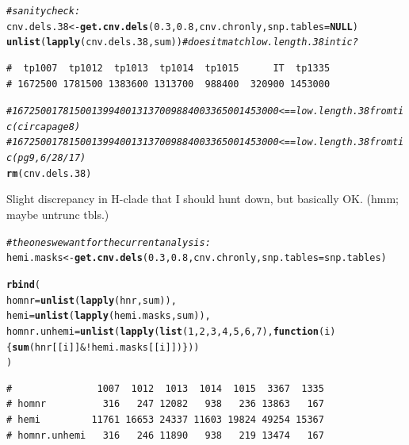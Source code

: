 \documentclass{article}\usepackage[]{graphicx}\usepackage[]{color}
\makeatletter
\newcommand{\hlnum}[1]{\textcolor[rgb]{0.686,0.059,0.569}{#1}}%
\newcommand{\hlcom}[1]{\textcolor[rgb]{0.678,0.584,0.686}{\textit{#1}}}%
\newcommand{\hlopt}[1]{\textcolor[rgb]{0,0,0}{#1}}%
\newcommand{\hlstd}[1]{\textcolor[rgb]{0.345,0.345,0.345}{#1}}%
\newcommand{\hlkwa}[1]{\textcolor[rgb]{0.161,0.373,0.58}{\textbf{#1}}}%
\newcommand{\hlkwb}[1]{\textcolor[rgb]{0.69,0.353,0.396}{#1}}%
\newcommand{\hlkwc}[1]{\textcolor[rgb]{0.333,0.667,0.333}{#1}}%
\newcommand{\hlkwd}[1]{\textcolor[rgb]{0.737,0.353,0.396}{\textbf{#1}}}%
\newenvironment{kframe}{%
 \def\at@end@of@kframe{}%
 \ifinner\ifhmode%
  \def\at@end@of@kframe{\end{minipage}}%
  \begin{minipage}{\columnwidth}%
 \fi\fi%
 \def\FrameCommand##1{\hskip\@totalleftmargin \hskip-\fboxsep
 \colorbox{shadecolor}{##1}\hskip-\fboxsep
     \hskip-\linewidth \hskip-\@totalleftmargin \hskip\columnwidth}%
 \MakeFramed {\advance\hsize-\width
   \@totalleftmargin\z@ \linewidth\hsize
   \@setminipage}}%
 {\par\unskip\endMakeFramed%
 \at@end@of@kframe}
\newenvironment{knitrout}{}{} %
\makeatother
\begin{document}
\begin{knitrout}
\begin{kframe}
\begin{alltt}
\hlcom{# sanity check:}
\hlstd{cnv.dels.38} \hlkwb{<-} \hlkwd{get.cnv.dels}\hlstd{(}\hlnum{0.3}\hlstd{,} \hlnum{0.8}\hlstd{, cnv.chronly,} \hlkwc{snp.tables} \hlstd{=} \hlkwa{NULL}\hlstd{)}
\hlkwd{unlist}\hlstd{(}\hlkwd{lapply}\hlstd{(cnv.dels.38,sum))} \hlcom{# does it match low.length.38 in tic ?}
\end{alltt}
\begin{verbatim}
#  tp1007  tp1012  tp1013  tp1014  tp1015      IT  tp1335 
# 1672500 1781500 1383600 1313700  988400  320900 1453000
\end{verbatim}
\begin{alltt}
\hlcom{# 1672500 1781500 1399400 1313700 988400 336500 1453000 <== low.length.38 from tic (circa page 8)}
\hlcom{# 1672500 1781500 1399400 1313700 988400 336500 1453000 <== low.length.38 from tic (pg9, 6/28/17)}
\hlkwd{rm}\hlstd{(cnv.dels.38)}
\end{alltt}
\end{kframe}
\end{knitrout}

Slight discrepancy in H-clade that I should hunt down, but basically OK. (hmm; maybe untrunc tbls.)

\begin{knitrout}\footnotesize
{}\color{fgcolor}\begin{kframe}
\begin{alltt}
\hlcom{# the ones we want for the current analysis:}
\hlstd{hemi.masks} \hlkwb{<-} \hlkwd{get.cnv.dels}\hlstd{(}\hlnum{0.3}\hlstd{,} \hlnum{0.8}\hlstd{, cnv.chronly,} \hlkwc{snp.tables}\hlstd{=snp.tables)}

\hlkwd{rbind}\hlstd{(}
  \hlkwc{homnr}        \hlstd{=} \hlkwd{unlist}\hlstd{(}\hlkwd{lapply}\hlstd{(hnr,sum)),}
  \hlkwc{hemi}         \hlstd{=} \hlkwd{unlist}\hlstd{(}\hlkwd{lapply}\hlstd{(hemi.masks, sum)),}
  \hlkwc{homnr.unhemi} \hlstd{=} \hlkwd{unlist}\hlstd{(}\hlkwd{lapply}\hlstd{(}\hlkwd{list}\hlstd{(}\hlnum{1}\hlstd{,}\hlnum{2}\hlstd{,}\hlnum{3}\hlstd{,}\hlnum{4}\hlstd{,}\hlnum{5}\hlstd{,}\hlnum{6}\hlstd{,}\hlnum{7}\hlstd{),} \hlkwa{function}\hlstd{(}\hlkwc{i}\hlstd{)\{}\hlkwd{sum}\hlstd{(hnr[[i]]} \hlopt{& !}\hlstd{hemi.masks[[i]])\}))}
\hlstd{)}
\end{alltt}
\begin{verbatim}
#               1007  1012  1013  1014  1015  3367  1335
# homnr          316   247 12082   938   236 13863   167
# hemi         11761 16653 24337 11603 19824 49254 15367
# homnr.unhemi   316   246 11890   938   219 13474   167
\end{verbatim}
\end{kframe}
\end{knitrout}
\end{document}
